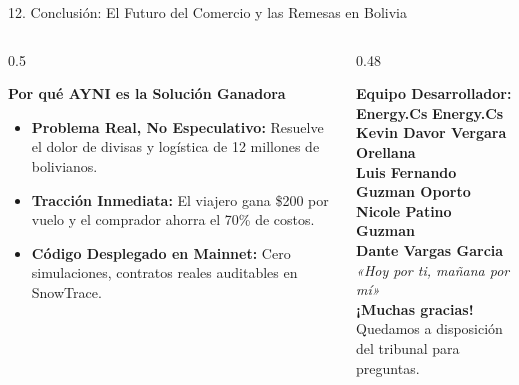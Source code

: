 \documentclass[10pt,aspectratio=169]{beamer}
\begin{document}
\begin{frame}{12. Conclusión: El Futuro del Comercio y las Remesas en Bolivia}
  \begin{columns}[T]
    \begin{column}{0.5\textwidth}
      \begin{block}{\textbf{Por qué AYNI es la Solución Ganadora}}
        \begin{itemize}
          \item \textbf{Problema Real, No Especulativo:} Resuelve el dolor de divisas y logística de 12 millones de bolivianos.
          \item \textbf{Tracción Inmediata:} El viajero gana \$200 por vuelo y el comprador ahorra el 70\% de costos.
          \item \textbf{Código Desplegado en Mainnet:} Cero simulaciones, contratos reales auditables en SnowTrace.
        \end{itemize}
      \end{block}
    \end{column}
    \begin{column}{0.48\textwidth}
      \begin{exampleblock}{\textbf{Equipo Desarrollador: Energy.Cs}}
        \centering
        \vspace{0.1cm}
        {\large \textbf{\textcolor{AyniNavy}{Energy.Cs}}}\\[0.15cm]
        \scriptsize
        \textbf{Kevin Davor Vergara Orellana}\\
        \textbf{Luis Fernando Guzman Oporto}\\
        \textbf{Nicole Patino Guzman}\\
        \textbf{Dante Vargas Garcia}\\[0.2cm]
        {\small \textit{«Hoy por ti, mañana por mí»}}\\[0.2cm]
        \textbf{\large ¡Muchas gracias!}\\
        \vspace{0.05cm}
        \scriptsize Quedamos a disposición del tribunal para preguntas.
      \end{exampleblock}
    \end{column}
  \end{columns}
\end{frame}
\end{document}
